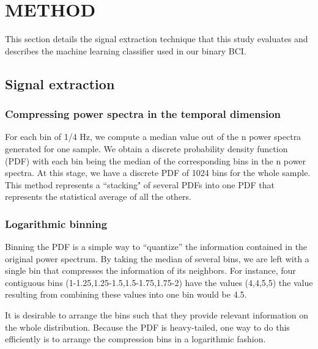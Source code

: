 \section{\uppercase{Method}}

This section details the signal extraction technique that this study evaluates and describes the machine learning classifier used in our binary BCI.

\subsection{Signal extraction}

\subsubsection{Compressing power spectra in the temporal dimension}

For each bin of 1/4 Hz, we compute a median value out of the n power spectra generated for one sample. We obtain a discrete probability density function (PDF) with each bin being the median of the corresponding bins in the n power spectra. At this stage, we have a discrete PDF of 1024 bins for the whole sample. This method represents a ``stacking" of several PDFs into one PDF that represents the statistical average of all the others.

\subsubsection{Logarithmic binning}

Binning the PDF is a simple way to ``quantize'' the information contained in the original power spectrum. By taking the median of several bins, we are left with a single bin that compresses the information of its neighbors. For instance, four contiguous bins (1-1.25,1.25-1.5,1.5-1.75,1.75-2) have the values (4,4,5,5) the value resulting from combining these values into one bin would be 4.5. 

It is desirable to arrange the bins such that they provide relevant information on the whole distribution. Because the PDF is heavy-tailed, one way to do this efficiently is to arrange the compression bins in a logarithmic fashion. 


